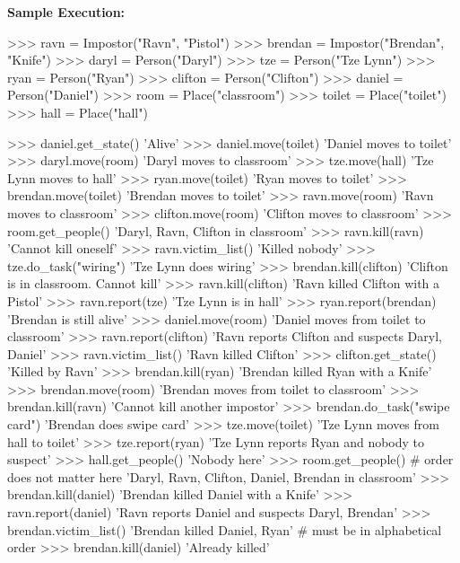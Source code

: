 \newpage
\textbf{Sample Execution:}
\begin{python}
>>> ravn = Impostor("Ravn", "Pistol")
>>> brendan = Impostor("Brendan", "Knife")
>>> daryl = Person("Daryl")
>>> tze = Person("Tze Lynn")
>>> ryan = Person("Ryan")
>>> clifton = Person("Clifton")
>>> daniel = Person("Daniel")
>>> room = Place("classroom")
>>> toilet = Place("toilet")
>>> hall = Place("hall")

>>> daniel.get_state()
'Alive'
>>> daniel.move(toilet)
'Daniel moves to toilet'
>>> daryl.move(room)
'Daryl moves to classroom'
>>> tze.move(hall)
'Tze Lynn moves to hall'
>>> ryan.move(toilet)
'Ryan moves to toilet'
>>> brendan.move(toilet)
'Brendan moves to toilet'
>>> ravn.move(room)
'Ravn moves to classroom'
>>> clifton.move(room)
'Clifton moves to classroom'
>>> room.get_people()
'Daryl, Ravn, Clifton in classroom'
>>> ravn.kill(ravn)
'Cannot kill oneself'
>>> ravn.victim_list()
'Killed nobody'
>>> tze.do_task("wiring")
'Tze Lynn does wiring'
>>> brendan.kill(clifton)
'Clifton is in classroom. Cannot kill'
>>> ravn.kill(clifton)
'Ravn killed Clifton with a Pistol'
>>> ravn.report(tze)
'Tze Lynn is in hall'
>>> ryan.report(brendan)
'Brendan is still alive'
>>> daniel.move(room)
'Daniel moves from toilet to classroom'
>>> ravn.report(clifton)
'Ravn reports Clifton and suspects Daryl, Daniel'
>>> ravn.victim_list()
'Ravn killed Clifton'
>>> clifton.get_state()
'Killed by Ravn'
>>> brendan.kill(ryan)
'Brendan killed Ryan with a Knife'
>>> brendan.move(room)
'Brendan moves from toilet to classroom'
>>> brendan.kill(ravn)
'Cannot kill another impostor'
>>> brendan.do_task("swipe card")
'Brendan does swipe card'
>>> tze.move(toilet)
'Tze Lynn moves from hall to toilet'
>>> tze.report(ryan)
'Tze Lynn reports Ryan and nobody to suspect'
>>> hall.get_people()
'Nobody here'
>>> room.get_people()    # order does not matter here
'Daryl, Ravn, Clifton, Daniel, Brendan in classroom'
>>> brendan.kill(daniel)
'Brendan killed Daniel with a Knife'
>>> ravn.report(daniel)
'Ravn reports Daniel and suspects Daryl, Brendan'
>>> brendan.victim_list()
'Brendan killed Daniel, Ryan'   # must be in alphabetical order
>>> brendan.kill(daniel)
'Already killed'
\end{python}

\newpage

